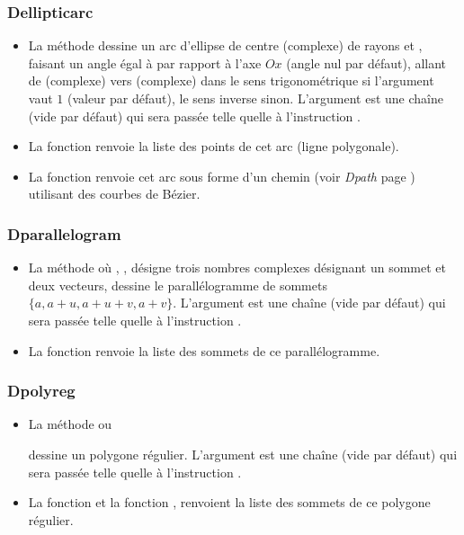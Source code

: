 \subsubsection{Dellipticarc}
\begin{itemize}
    \item La méthode  dessine un arc d'ellipse de centre  (complexe) de rayons  et , faisant un angle égal à  par rapport à l'axe \(Ox\) (angle nul par défaut), allant de  (complexe) vers  (complexe) dans le sens trigonométrique si l'argument  vaut $1$ (valeur par défaut), le sens inverse sinon. L'argument  est une chaîne (vide par défaut) qui sera passée telle quelle à l'instruction \drawcmd.
    \item La fonction  renvoie la liste des points de cet arc (ligne polygonale). 
    \item La fonction  renvoie cet arc sous forme d'un chemin (voir \emph{Dpath} page \pageref{Dpath}) utilisant des courbes de Bézier.
\end{itemize}

\subsubsection{Dparallelogram}
\begin{itemize}
    \item La méthode  où , ,  désigne trois nombres complexes désignant un sommet et deux vecteurs, dessine le parallélogramme de sommets $\{a,a+u,a+u+v,a+v\}$. L'argument  est une chaîne (vide par défaut) qui sera passée telle quelle à l'instruction \drawcmd.
    \item La fonction  renvoie la liste des sommets de ce parallélogramme.
\end{itemize}

\subsubsection{Dpolyreg}
\begin{itemize}
    \item La méthode  ou \par {} dessine un polygone régulier. L'argument  est une chaîne (vide par défaut) qui sera passée telle quelle à l'instruction \drawcmd.
    \item La fonction  et la fonction , renvoient la liste des sommets de ce polygone régulier.
\end{itemize}

